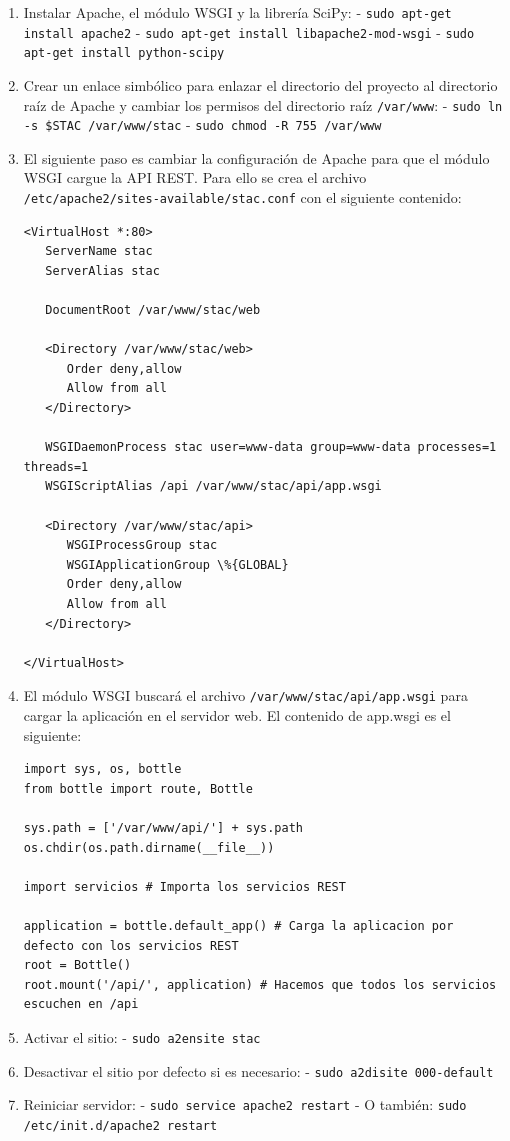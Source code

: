 \begin{enumerate}
\item Instalar Apache, el módulo WSGI y la librería SciPy:
\newpage
\subitem - \texttt{sudo apt-get install apache2}
\subitem - \texttt{sudo apt-get install libapache2-mod-wsgi}
\subitem - \texttt{sudo apt-get install python-scipy}
\item Crear un enlace simbólico para enlazar el directorio del proyecto al directorio raíz de Apache y cambiar los permisos del directorio raíz \texttt{/var/www}:
\subitem - \texttt{sudo ln -s \$STAC /var/www/stac}
\subitem - \texttt{sudo chmod -R 755 /var/www}
\item El siguiente paso es cambiar la configuración de Apache para que el módulo WSGI cargue la API REST. Para ello se crea el archivo \texttt{/etc/apache2/sites-available/stac.conf} con el siguiente contenido:
\begin{lstlisting}
<VirtualHost *:80>
   ServerName stac
   ServerAlias stac
   
   DocumentRoot /var/www/stac/web
   
   <Directory /var/www/stac/web>
      Order deny,allow
      Allow from all
   </Directory>

   WSGIDaemonProcess stac user=www-data group=www-data processes=1 threads=1
   WSGIScriptAlias /api /var/www/stac/api/app.wsgi
   
   <Directory /var/www/stac/api>
      WSGIProcessGroup stac
      WSGIApplicationGroup \%{GLOBAL}
      Order deny,allow
      Allow from all
   </Directory>

</VirtualHost>
\end{lstlisting}
\item El módulo WSGI buscará el archivo \texttt{/var/www/stac/api/app.wsgi} para cargar la aplicación en el servidor web. El contenido de app.wsgi es el siguiente:
\begin{lstlisting}
import sys, os, bottle
from bottle import route, Bottle

sys.path = ['/var/www/api/'] + sys.path
os.chdir(os.path.dirname(__file__))

import servicios # Importa los servicios REST

application = bottle.default_app() # Carga la aplicacion por defecto con los servicios REST
root = Bottle()
root.mount('/api/', application) # Hacemos que todos los servicios escuchen en /api
\end{lstlisting}
\item Activar el sitio:
\subitem - \texttt{sudo a2ensite stac}
\item Desactivar el sitio por defecto si es necesario:
\subitem - \texttt{sudo a2disite 000-default}
\item Reiniciar servidor:
\subitem - \texttt{sudo service apache2 restart}
\subitem - O también: \texttt{sudo /etc/init.d/apache2 restart}
\end{enumerate}